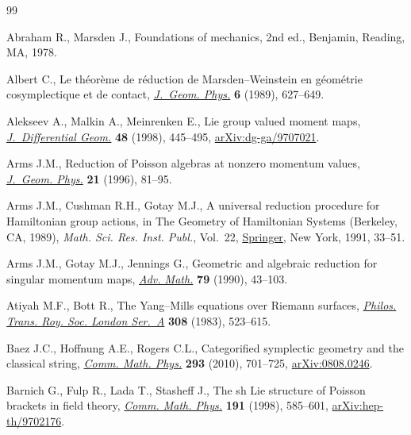 \documentclass[10pt,a4paper]{amsart}
\numberwithin{equation}{section}
\begin{document}
\begin{thebibliography}{99}
\footnotesize\itemsep=0pt

Abraham R., Marsden J., Foundations of mechanics, 2nd ed., Benjamin, Reading,
  MA, 1978.

Albert C., Le th\'eor\`eme de r\'eduction de {M}arsden--{W}einstein en
  g\'eom\'etrie cosymplectique et de contact, \href{https://doi.org/10.1016/0393-0440(89)90029-6}{\textit{J.~Geom. Phys.}}
  \textbf{6} (1989), 627--649.

Alekseev A., Malkin A., Meinrenken E., Lie group valued moment maps,
  \href{https://doi.org/10.4310/jdg/1214460860}{\textit{J.~Differential Geom.}} \textbf{48} (1998), 445--495,
  \href{https://arxiv.org/abs/dg-ga/9707021}{arXiv:dg-ga/9707021}.

Arms J.M., Reduction of {P}oisson algebras at nonzero momentum values,
  \href{https://doi.org/10.1016/S0393-0440(96)00009-5}{\textit{J.~Geom. Phys.}} \textbf{21} (1996), 81--95.

Arms J.M., Cushman R.H., Gotay M.J., A universal reduction procedure for
  {H}amiltonian group actions, in The Geometry of {H}amiltonian Systems
  ({B}erkeley, {CA}, 1989), \textit{Math. Sci. Res. Inst. Publ.}, Vol.~22,
  \href{https://doi.org/10.1007/978-1-4613-9725-0_4}{Springer}, New York, 1991, 33--51.

Arms J.M., Gotay M.J., Jennings G., Geometric and algebraic reduction for
  singular momentum maps, \href{https://doi.org/10.1016/0001-8708(90)90058-U}{\textit{Adv. Math.}} \textbf{79} (1990), 43--103.

Atiyah M.F., Bott R., The {Y}ang--{M}ills equations over {R}iemann surfaces,
  \href{https://doi.org/10.1098/rsta.1983.0017}{\textit{Philos. Trans. Roy. Soc. London Ser.~A}} \textbf{308} (1983),
  523--615.

Baez J.C., Hoffnung A.E., Rogers C.L., Categorified symplectic geometry and the
  classical string, \href{https://doi.org/10.1007/s00220-009-0951-9}{\textit{Comm. Math. Phys.}} \textbf{293} (2010), 701--725,
  \href{https://arxiv.org/abs/0808.0246}{arXiv:0808.0246}.

Barnich G., Fulp R., Lada T., Stasheff J., The sh {L}ie structure of {P}oisson
  brackets in field theory, \href{https://doi.org/10.1007/s002200050278}{\textit{Comm. Math. Phys.}} \textbf{191} (1998),
  585--601, \href{https://arxiv.org/abs/hep-th/9702176}{arXiv:hep-th/9702176}.


\end{thebibliography}
\end{document}
